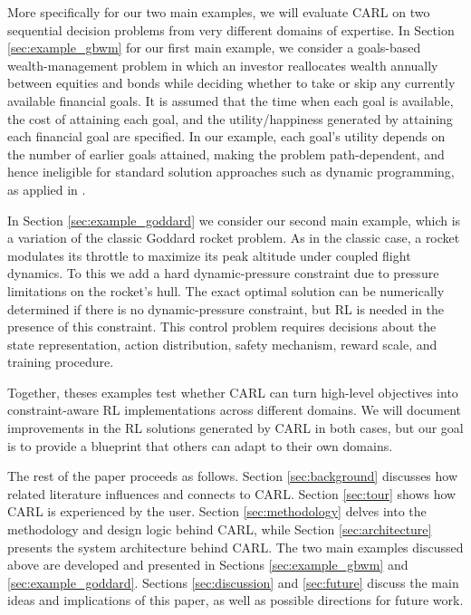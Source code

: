 \documentclass[mnsc,sglanonrev]{informs4}
\begin{document}
More specifically for our two main examples, we will evaluate CARL on two sequential decision problems from very different domains of expertise. In Section \ref{sec:example_gbwm} for our first main example, we consider a goals-based wealth-management problem in which an investor reallocates wealth annually between equities and bonds while deciding whether to take or skip any currently available financial goals. It is assumed that the time when each goal is available, the cost of attaining each goal, and the utility/happiness generated by attaining each financial goal are specified. In our example, each goal's utility depends on the number of earlier goals attained, making the problem path-dependent, and hence ineligible for standard solution approaches such as dynamic programming, as applied in \cite{das_dynamic_2022}. 

In Section \ref{sec:example_goddard} we consider our second main example, which is a variation of the classic Goddard rocket problem. As in the classic case, a rocket modulates its throttle to maximize its peak altitude under coupled flight dynamics. To this we add a hard dynamic-pressure constraint due to pressure limitations on the rocket's hull. The exact optimal solution can be numerically determined if there is no dynamic-pressure constraint, but RL is needed in the presence of this constraint. This control problem requires decisions about the state representation, action distribution, safety mechanism, reward scale, and training procedure. 

Together, theses examples test whether CARL can turn high-level objectives into constraint-aware RL implementations across different domains. We will document improvements in the RL solutions generated by CARL in both cases, but our goal is to provide a blueprint that others can adapt to their own domains.

The rest of the paper proceeds as follows. Section \ref{sec:background} discusses how related literature influences and connects to CARL. Section \ref{sec:tour} shows how CARL is experienced by the user. Section \ref{sec:methodology} delves into the methodology and design logic behind CARL, while Section \ref{sec:architecture} presents the system architecture behind CARL. The two main examples discussed above are developed and presented in Sections \ref{sec:example_gbwm} and \ref{sec:example_goddard}. Sections \ref{sec:discussion} and \ref{sec:future} discuss the main ideas and implications of this paper, as well as possible directions for future work.
\end{document}
